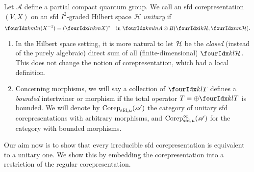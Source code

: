 \begin{Def} Let $\mathscr{A}$ define a partial compact quantum group. We call an sfd corepresentation $(V,X)$ on an sfd $I^2$-graded Hilbert space $\mathcal{H}$
\emph{unitary} if \[\Gr{(X^{-1})}{k}{l}{m}{n}=(\Gr{X}{l}{k}{n}{m})^{*}\quad \textrm{in }\Gr{A}{k}{l}{m}{n}\otimes B(\Gru{\Hsp}{l}{k},\Gru{\Hsp}{n}{m}).\]  
\end{Def} 
\begin{Rem} \begin{enumerate} \item In the Hilbert space setting, it is more natural to let $\mathcal{H}$ be the \emph{closed} (instead of the purely algebraic) direct sum of all (finite-dimensional) $\Gru{\Hsp}{k}{l}$. This does not change the notion of corepresentation, which had a local definition.
\item Concerning morphisms, we will say a collection of $\Gru{T}{k}{l}$ defines a \emph{bounded} intertwiner or morphism if the total operator $T= \oplus \Gru{T}{k}{l}$ is bounded. We will denote by $\mathrm{Corep}_{\mathrm{sfd},u}(\mathscr{A})$ the category of unitary sfd corepresentations with arbitrary morphisms, and $\mathrm{Corep}_{\mathrm{sfd},u}^{\infty}(\mathscr{A})$ for the category with bounded morphisms.
\end{enumerate}
\end{Rem}

Our aim now is to show that every irreducible sfd corepresentation is
equivalent to a unitary one. We show this by embedding the corepresentation into a restriction of the
regular corepresentation.

